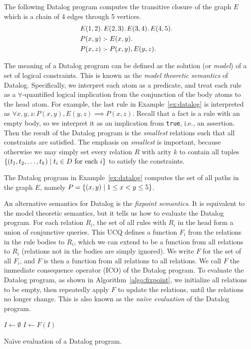 \begin{ex}
\label{ex:datalog}
The following Datalog program computes the transitive closure of the graph $E$ 
 which is a chain of 4 edges through 5 vertices.
\begin{align*}
  &E(1, 2). \, E(2, 3). \, E(3, 4). \, E(4, 5).\\
  &P(x, y) \text{ :- } E(x, y).\\
  &P(x, z) \text{ :- } P(x, y), E(y, z).
\end{align*}
\end{ex}

The meaning of a Datalog program can be defined as the solution (or {\em model}) of 
 a set of logical constraints.
This is known as the {\em model theoretic semantics} of Datalog.
Specifically, we interpret each atom as a predicate,
 and treat each rule as a $\forall$-quantified logical implication
 from the conjunction of the body atoms to the head atom.
For example, the last rule in Example~\ref{ex:datalog} 
 is interpreted as $\forall x, y, z : P(x, y), E(y, z) \implies P(x, z)$.
Recall that a fact is a rule with an empty body,
 so we interpret it as an implication from \texttt{true}, 
 i.e., an assertion.
Then the result of the Datalog program is the {\em smallest} relations 
 such that all constraints are satisfied.
The emphasis on {\em smallest} is important, 
 because otherwise we may simply set every relation $R$ with arity $k$ 
 to contain all tuples $\{{(t_1, t_2, \ldots, t_k)}\mid{t_i \in D \text{ for each } i}\}$
 to satisfy the constraints.

\begin{ex}
\label{ex:tc}
The Datalog program in Example~\ref{ex:datalog}
 computes the set of all paths in the graph $E$, 
 namely $P = \{{(x, y)}\mid{1 \leq x < y \leq 5}\}$. 
\end{ex}

An alternative semantics for Datalog is the {\em fixpoint semantics}.
It is equivalent to the model theoretic semantics,
 but it tells us how to evaluate the Datalog program.
For each relation $R_i$, the set of all rules with $R_i$ in the head 
 form a union of conjunctive queries.
This UCQ defines a function $F_i$ from the relations in the rule bodies to $R_i$,
 which we can extend to be a function from all relations to $R_i$ 
 (relations not in the bodies are simply ignored). 
We write $F$ for the set of all $F_i$, 
 and $F$ is then a function from all relations to all relations.
We call $F$ the immediate consequence operator (ICO) of the Datalog program.
To evaluate the Datalog program, as shown in Algorithm~\ref{algo:fixpoint},
 we initialize all relations to be empty,
 then repeatedly apply $F$ to update the relations, 
 until the relations no longer change.
This is also known as the {\em na\"ive evaluation} of the Datalog program.
\begin{algorithm}
$I \gets \emptyset$\;
{
    $I \gets F(I)$\;
}
\caption{Na\"ive evaluation of a Datalog program.}
\label{algo:fixpoint}
\end{algorithm}


